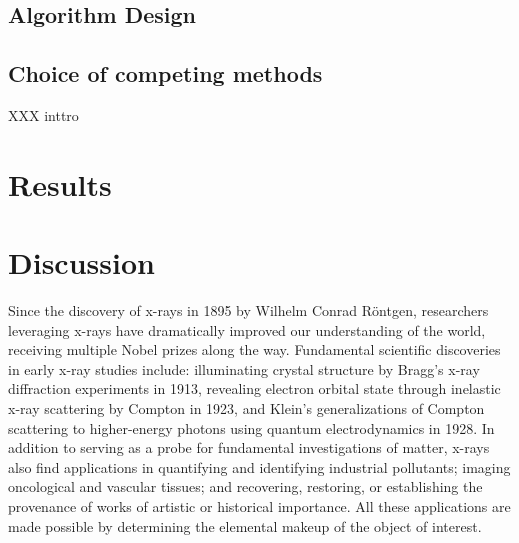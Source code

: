\documentclass[%
  aip,12pt,tightenlines,
  amsthm,
 amsmath,amssymb
]{article}
\newcommand{\fLabel}[1]{\label{figure:#1}}
\newcommand{\sLabel}[1]{\label{section:#1}}
\newcommand{\pcaption}[1]{\caption{\noindent#1}}
\newcommand{\firstp}[0]{}
\newcommand{\pl}[0]{\vspace{6pt}}
\newcommand{\pEndF}[0]{ \\ }
\newcommand{\pStartF}[0]{ }
\begin{document}
\subsection{\sLabel{Algorithm}Algorithm Design}

\subsection{\sLabel{Compare}Choice of competing methods}

XXX inttro

\section{\sLabel{Results}Results}

\section{\sLabel{Discussion}Discussion}


\firstp Since the discovery of x-rays in 1895 by Wilhelm Conrad R{\"o}ntgen, researchers leveraging x-rays have dramatically improved our understanding of the world, receiving multiple Nobel prizes along the way.\cite{santra_concepts_2009} Fundamental scientific discoveries in early x-ray studies include: illuminating crystal structure by Bragg's x-ray diffraction experiments in 1913,\cite{bragg_reflection_1913} revealing electron orbital state through inelastic x-ray scattering by Compton in 1923,\cite{compton_spectrum_1923} and Klein's generalizations of Compton scattering to higher-energy photons using quantum electrodynamics in 1928.\cite{klein_scattering_1928} In addition to serving as a probe for fundamental investigations of matter, x-rays also find applications in quantifying and identifying industrial pollutants;\cite{luo_determination_2012} imaging oncological and vascular tissues;\cite{butler_bio-medical_2008} and recovering, restoring, or establishing the provenance of works of artistic \cite{janssens_photon-based_2010} or historical \cite{bergmann_archimedes_2007} importance. All these applications are made possible by determining the elemental makeup of the object of interest. \pl

\end{document}
